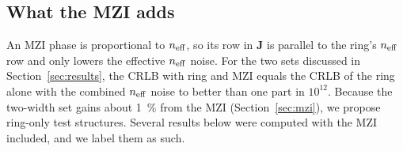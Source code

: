 \subsection{What the MZI adds}

An MZI phase is proportional to $n_\mathrm{eff}$, so its row in $\mathbf{J}$ is parallel to the ring's $n_\mathrm{eff}$ row and only
lowers the effective $n_\mathrm{eff}$ noise. For the two sets discussed in Section~\ref{sec:results}, the CRLB with ring and MZI
equals the CRLB of the ring alone with the combined $n_\mathrm{eff}$ noise to better than one part in $10^{12}$. Because the
two-width set gains about \qty{1}{\percent} from the MZI (Section~\ref{sec:mzi}), we propose ring-only test
structures. Several results below were computed with the MZI included, and we label them as such.
